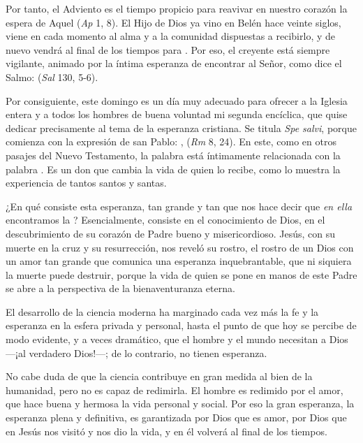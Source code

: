 Por tanto, el Adviento es el tiempo propicio para reavivar en nuestro corazón la espera de Aquel  (\emph{Ap} 1, 8). El Hijo de Dios ya vino en Belén hace veinte siglos, viene en cada momento al alma y a la comunidad dispuestas a recibirlo, y de nuevo vendrá al final de los tiempos para . Por eso, el creyente está siempre vigilante, animado por la íntima esperanza de encontrar al Señor, como dice el Salmo:  (\emph{Sal} 130, 5-6).

Por consiguiente, este domingo es un día muy adecuado para ofrecer a la Iglesia entera y a todos los hombres de buena voluntad mi segunda encíclica, que quise dedicar precisamente al tema de la esperanza cristiana. Se titula \emph{Spe salvi}, porque comienza con la expresión de san Pablo: \emph{},  (\emph{Rm} 8, 24). En este, como en otros pasajes del Nuevo Testamento, la palabra  está íntimamente relacionada con la palabra . Es un don que cambia la vida de quien lo recibe, como lo muestra la experiencia de tantos santos y santas.

¿En qué consiste esta esperanza, tan grande y tan  que nos hace decir que \emph{en ella} encontramos la ? Esencialmente, consiste en el conocimiento de Dios, en el descubrimiento de su corazón de Padre bueno y misericordioso. Jesús, con su muerte en la cruz y su resurrección, nos reveló su rostro, el rostro de un Dios con un amor tan grande que comunica una esperanza inquebrantable, que ni siquiera la muerte puede destruir, porque la vida de quien se pone en manos de este Padre se abre a la perspectiva de la bienaventuranza eterna.

El desarrollo de la ciencia moderna ha marginado cada vez más la fe y la esperanza en la esfera privada y personal, hasta el punto de que hoy se percibe de modo evidente, y a veces dramático, que el hombre y el mundo necesitan a Dios ---¡al verdadero Dios!---; de lo contrario, no tienen esperanza.

No cabe duda de que la ciencia contribuye en gran medida al bien de la humanidad, pero no es capaz de redimirla. El hombre es redimido por el amor, que hace buena y hermosa la vida personal y social. Por eso la gran esperanza, la esperanza plena y definitiva, es garantizada por Dios que es amor, por Dios que en Jesús nos visitó y nos dio la vida, y en él volverá al final de los tiempos.


